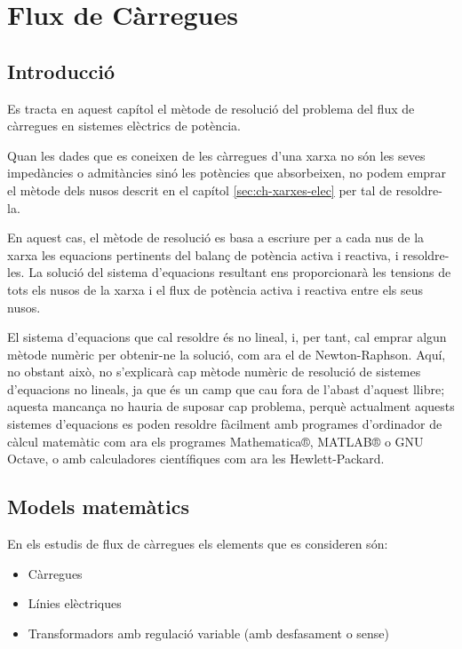 
\chapter{Flux de Càrregues}
\label{sec:ch-flux-carregues}

\section{Introducció}

Es tracta en aquest capítol el mètode de resolució del problema del flux de càrregues en
sistemes elèctrics de potència.

Quan les dades que es coneixen de les càrregues d'una xarxa no són
les seves impedàncies o admitàncies sinó les potències que
absorbeixen, no podem emprar el mètode dels nusos descrit en el
capítol \ref{sec:ch-xarxes-elec} per tal de resoldre-la.

En aquest cas, el mètode de resolució es basa a escriure per a cada
nus de la xarxa les equacions pertinents del balanç de potència activa i
reactiva, i resoldre-les. La solució del sistema d'equacions
resultant ens proporcionarà les tensions de tots els nusos de la
xarxa i el flux de potència activa i reactiva entre els seus nusos.

El sistema d'equacions que cal resoldre és no lineal, i, per tant,
cal emprar algun mètode numèric per obtenir-ne la solució, com ara el
de Newton-Raphson.  Aquí, no obstant això, no
s'explicarà cap mètode numèric de resolució de sistemes d'equacions
no lineals, ja que és un camp que cau fora de l'abast d'aquest llibre; aquesta mancança  no hauria de suposar cap problema, perquè actualment aquests
sistemes d'equacions es poden resoldre fàcilment amb programes
d'ordinador de càlcul matemàtic com ara els programes
Mathematica®, MATLAB® o GNU Octave, o amb calculadores
científiques com ara les Hewlett-Packard.

\section{Models matemàtics} 

En els estudis de flux de càrregues els elements que es consideren són:
\begin{itemize}
   \item Càrregues
   \item Línies elèctriques
   \item Transformadors amb regulació variable (amb desfasament o sense)
\end{itemize}

